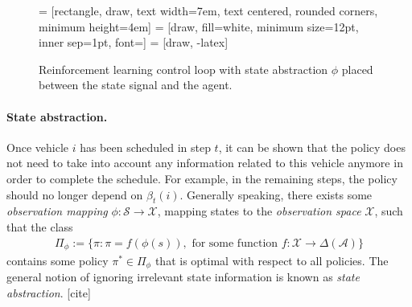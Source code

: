 \documentclass[a4paper]{report}
\theoremstyle{definition}
\theoremstyle{plain}
\newcommand\note[1]{{\color{Navy}#1}}
\begin{document}
\begin{figure}[h]
\centering
{} = [rectangle, draw,
    text width=7em, text centered, rounded corners, minimum height=4em]
 = [draw, fill=white, minimum size=12pt, inner sep=1pt, font=\small]
 = [draw, -latex]
\caption{Reinforcement learning control loop with state abstraction $\phi$
  placed between the state signal and the agent.}\label{fig:state-abstraction}
\end{figure}


\paragraph{State abstraction.}

Once vehicle $i$ has been scheduled in step $t$, it can be shown that the policy
does not need to take into account any information related to this vehicle
anymore in order to complete the schedule.
%
For example, in the remaining steps, the policy should no longer depend on
$\beta_t(i)$.
%
Generally speaking, there exists some \emph{observation mapping} $\phi : \mathcal{S} \rightarrow \mathcal{X}$, mapping states to the \emph{observation space} $\mathcal{X}$, such that the class
\begin{align}
  \Pi_\phi := \{ \pi : \pi = f(\phi(s)) , \text{ for some function } f : \mathcal{X} \rightarrow \Delta(\mathcal{A}) \}
\end{align}
contains some policy $\pi^* \in \Pi_\phi$ that is optimal with respect to all policies.
%
The general notion of ignoring irrelevant state information is known as
\emph{state abstraction}. \note{[cite]}
\end{document}
